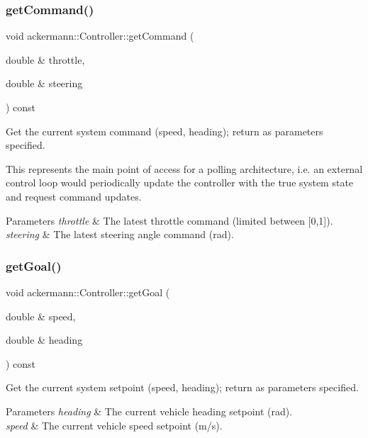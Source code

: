 \subsubsection{\texorpdfstring{get\+Command()}{getCommand()}}
{\footnotesize\ttfamily void ackermann\+::\+Controller\+::get\+Command (\begin{DoxyParamCaption}\item[{double \&}]{throttle,  }\item[{double \&}]{steering }\end{DoxyParamCaption}) const}



Get the current system command (speed, heading); return as parameters specified. 

This represents the main point of access for a polling architecture, i.\+e. an external control loop would periodically update the controller with the true system state and request command updates.


\begin{DoxyParams}{Parameters}
{\em throttle} & The latest throttle command (limited between \mbox{[}0,1\mbox{]}). \\
\hline
{\em steering} & The latest steering angle command (rad). \\
\hline
\end{DoxyParams}
\mbox{\label{classackermann_1_1_controller_ad768d0fdc4ad85510ba90af05ef6e4c4}} 
\subsubsection{\texorpdfstring{get\+Goal()}{getGoal()}}
{\footnotesize\ttfamily void ackermann\+::\+Controller\+::get\+Goal (\begin{DoxyParamCaption}\item[{double \&}]{speed,  }\item[{double \&}]{heading }\end{DoxyParamCaption}) const}



Get the current system setpoint (speed, heading); return as parameters specified. 


\begin{DoxyParams}{Parameters}
{\em heading} & The current vehicle heading setpoint (rad). \\
\hline
{\em speed} & The current vehicle speed setpoint (m/s). \\
\hline
\end{DoxyParams}
\mbox{\label{classackermann_1_1_controller_a6a282c7083ce5a240d5e8e71782cb106}} 
